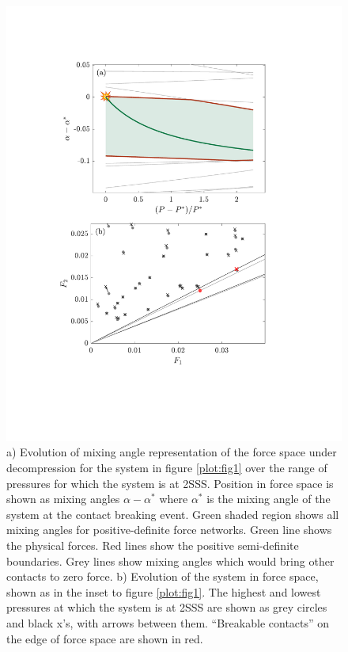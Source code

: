 \begin{figure}[h!]
\includegraphics[width=\columnwidth, trim=98 140 139 101, clip]{contactBreakingPaper/combinedTrajectoryComparison.pdf}
\caption{a) Evolution of mixing angle representation of the force space under decompression for the system in figure \ref{plot:fig1} over the range of pressures for which the system is at 2SSS. Position in force space is shown as mixing angles $\alpha-\alpha^*$ where $\alpha^*$ is the mixing angle of the system at the contact breaking event. Green shaded region shows all mixing angles for positive-definite force networks.  Green line shows the physical forces.  Red lines show the positive semi-definite boundaries.  Grey lines show mixing angles which would bring other contacts to zero force.
b) Evolution of the system in force space, shown as in the inset to figure \ref{plot:fig1}. The highest and lowest pressures at which the system is at 2SSS are shown as grey circles and black x's, with arrows between them. ``Breakable contacts'' on the edge of force space are shown in red.}
\label{plot:trajectory}
\end{figure}

